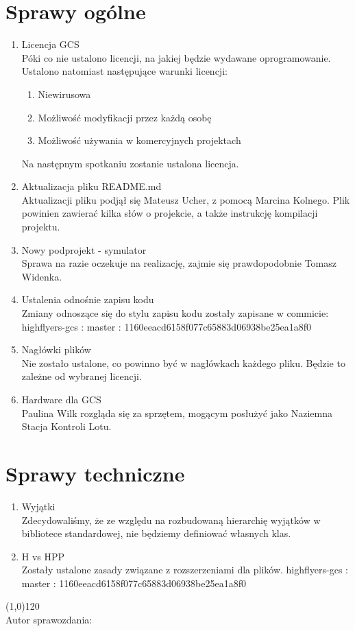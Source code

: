 \documentclass[a4paper,12pt]{article}
\begin{document}
\section{Sprawy ogólne}
\begin{enumerate}
\item{Licencja GCS}\\
  Póki co nie ustalono licencji, na jakiej będzie wydawane oprogramowanie. Ustalono natomiast następujące warunki licencji:
  \begin{enumerate}
  \item{Niewirusowa}
  \item{Możliwość modyfikacji przez każdą osobę}
  \item{Możliwość używania w komercyjnych projektach}
  \end{enumerate}
  Na następnym spotkaniu zostanie ustalona licencja.
\item{Aktualizacja pliku README.md}\\
  Aktualizacji pliku podjął się Mateusz Ucher, z pomocą Marcina Kolnego. Plik powinien zawierać kilka słów o projekcie, a także instrukcję kompilacji projektu.
\item{Nowy podprojekt - symulator}\\
  Sprawa na razie oczekuje na realizację, zajmie się prawdopodobnie Tomasz Widenka.
\item{Ustalenia odnośnie zapisu kodu}\\
  Zmiany odnoszące się do stylu zapisu kodu zostały zapisane w commicie: highflyers-gcs : master : 1160eeacd6158f077c65883d06938be25ea1a8f0
\item{Nagłówki plików}\\
  Nie zostało ustalone, co powinno być w nagłówkach każdego pliku. Będzie to zależne od wybranej licencji.
\item{Hardware dla GCS}\\
  Paulina Wilk rozgląda się za sprzętem, mogącym posłużyć jako Naziemna Stacja Kontroli Lotu.
\end{enumerate}

\section{Sprawy techniczne}
\begin{enumerate}
\item{Wyjątki}\\
  Zdecydowaliśmy, że ze względu na rozbudowaną hierarchię wyjątków w bibliotece standardowej, nie będziemy definiować własnych klas.
\item{H vs HPP}\\
  Zostały ustalone zasady związane z rozszerzeniami dla plików. highflyers-gcs : master : 1160eeacd6158f077c65883d06938be25ea1a8f0
\end{enumerate}
\begin{flushright}
  \line(1,0){120}\\
  Autor sprawozdania:\\
  \makeatletter
  \emph{\@author}
  \makeatother
\end{flushright}
\end{document}

